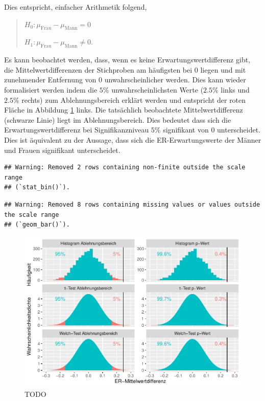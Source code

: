 \documentclass[
]{book}
\theoremstyle{definition}
\theoremstyle{definition}
\theoremstyle{definition}
\theoremstyle{definition}
\theoremstyle{remark}
\begin{document}
Dies entspricht, einfacher Arithmetik folgend,

\begin{quote}
\(H_0: \mu_\text{Frau} - \mu_\text{Mann} = 0\)

\(H_1: \mu_\text{Frau} - \mu_\text{Mann} \neq 0.\)
\end{quote}

Es kann beobachtet werden, dass, wenn es keine Erwartungswertdifferenz gibt, die Mittelwertdifferenzen der Stichproben am häufigsten bei \(0\) liegen und mit zunehmender Entfernung von \(0\) unwahrscheinlicher werden. Dies kann wieder formalisiert werden indem die \(5\%\) unwahrscheinlichsten Werte (\(2.5\%\) links und \(2.5\%\) rechts) zum Ablehnungsbereich erklärt werden und entspricht der roten Fläche in Abbildung \ref{fig:exm-breakup-hist-pval-reja} links. Die tatsächlich beobachtete Mittelwertdifferenz (schwarze Linie) liegt im Ablehnungsbereich. Dies bedeutet dass sich die Erwartungswertdifferenz bei Signifikanzniveau \(5\%\) signifikant von \(0\) unterscheidet. Dies ist äquivalent zu der Aussage, dass sich die ER-Erwartungswerte der Männer und Frauen signifikant unterscheidet.

\begin{verbatim}
## Warning: Removed 2 rows containing non-finite outside the scale range
## (`stat_bin()`).
\end{verbatim}

\begin{verbatim}
## Warning: Removed 8 rows containing missing values or values outside the scale range
## (`geom_bar()`).
\end{verbatim}

\begin{figure}
\centering
\includegraphics{aps_statistik1_files/figure-latex/exm-breakup-hist-pval-reja-1.pdf}
\caption{\label{fig:exm-breakup-hist-pval-reja}TODO}
\end{figure}
\end{document}
